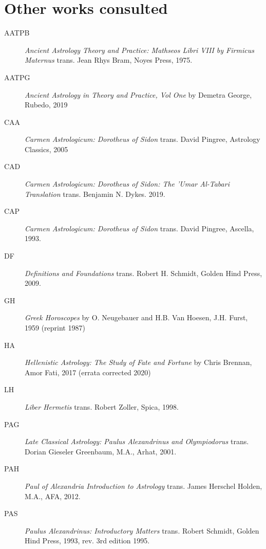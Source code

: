 \section{Other works consulted}
\begin{description}
\item[AATPB]
	\textsl{Ancient Astrology Theory and Practice: Mathseos Libri VIII by Firmicus Maternus} trans. Jean Rhys Bram, Noyes Press, 1975.	
	
\item[AATPG] \textsl{Ancient Astrology in Theory and Practice, Vol One} by Demetra George, Rubedo, 2019

\item[CAA]
	\textsl{Carmen Astrologicum: Dorotheus of Sidon} trans. David Pingree, Astrology Classics, 2005

\item[CAD]
	\textsl{Carmen Astrologicum: Dorotheus of Sidon: The 'Umar Al-Tabari Translation} trans. Benjamin N. Dykes. 2019.

\item[CAP]
	\textsl{Carmen Astrologicum: Dorotheus of Sidon} trans. David Pingree, Ascella, 1993.

\item[DF]
	\textsl{Definitions and Foundations} trans. Robert H. Schmidt, Golden Hind Press, 2009.
	
\item[GH] 
	\textsl{Greek Horoscopes} by O. Neugebauer and H.B. Van Hoesen, J.H. Furst, 1959 (reprint 1987)
	
\item[HA] 
	\textsl{Hellenistic Astrology: The Study of Fate and Fortune} by Chris Brennan, Amor Fati, 2017 (errata corrected 2020)
	
\item[LH]
	\textsl{Liber Hermetis} trans. Robert Zoller, Spica, 1998.
	
\item[PAG] 
	\textsl{Late Classical Astrology: Paulus Alexandrinus and Olympiodorus} trans. Dorian Gieseler Greenbaum, M.A., Arhat, 2001.

\item[PAH] 
	\textsl{Paul of Alexandria Introduction to Astrology} trans. James Herschel Holden, M.A., AFA, 2012.

\item[PAS] 
	\textsl{Paulus Alexandrinus: Introductory Matters} trans. Robert Schmidt, Golden Hind Press, 1993, rev. 3rd edition 1995.
	

\end{description}
